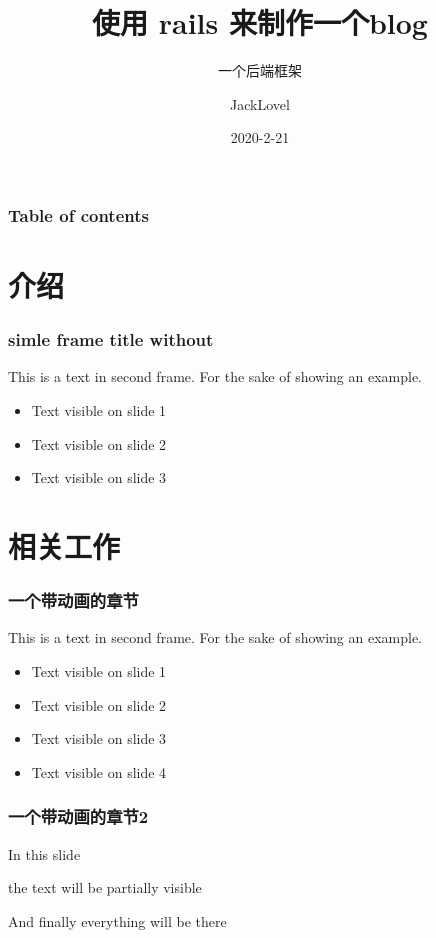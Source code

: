 \documentclass{beamer}
\title{使用 rails 来制作一个blog}
\subtitle{一个后端框架}
\author{JackLovel}
\date{2020-2-21}
\begin{document}
	
\frame{\titlepage}
\begin{frame}
\frametitle{Table of contents}
\tableofcontents
\end{frame}

\section{介绍}

\begin{frame}
\frametitle{simle frame title without}

This is a text in second frame. For the sake of showing an example.

\begin{itemize}
\item Text visible on slide 1 
\item Text visible on slide 2
\item Text visible on slide 3 
\end{itemize}
\end{frame}

\section{相关工作}
\begin{frame}
	\frametitle{一个带动画的章节}
	
	This is a text in second frame. For the sake of showing an example.
	
	\begin{itemize}
		\item<1-> Text visible on slide 1 
		\item<2-> Text visible on slide 2
		\item<3-> Text visible on slide 3 
	    \item<4-> Text visible on slide 4
	\end{itemize}
\end{frame}


\begin{frame}
\frametitle{一个带动画的章节2}
In this slide\pause

the text will be partially visible\pause

And finally everything will be there 
\end{frame}
\end{document}
